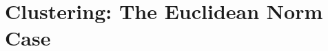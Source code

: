 \documentclass[12pt]{article}
\numberwithin{equation}{section}
\begin{document}
\section{Clustering: The Euclidean Norm Case}

%
%
\end{document}
